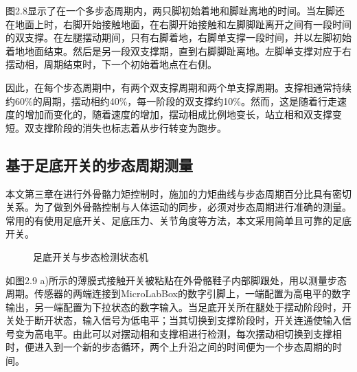 图2.8显示了在一个多步态周期内，两只脚初始着地和脚趾离地的时间。当左脚还在地面上时，右脚开始接触地面，在右脚开始接触和左脚脚趾离开之间有一段时间的双支撑。在左腿摆动期间，只有右脚着地，右脚单支撑一段时间，并以左脚初始着地地面结束。然后是另一段双支撑期，直到右脚脚趾离地。左脚单支撑对应于右摆动相，周期结束时，下一个初始着地点在右侧。

因此，在每个步态周期中，有两个双支撑周期和两个单支撑周期。支撑相通常持续约60\%的周期，摆动相约40\%，每一阶段的双支撑约10\%。然而，这是随着行走速度的增加而变化的，随着速度的增加，摆动相成比例地变长，站立相和双支撑变短。双支撑阶段的消失也标志着从步行转变为跑步。

\subsection{基于足底开关的步态周期测量}

本文第三章在进行外骨骼力矩控制时，施加的力矩曲线与步态周期百分比具有密切关系。为了做到外骨骼控制与人体运动的同步，必须对步态周期进行准确的测量。常用的有使用足底开关、足底压力、关节角度等方法，本文采用简单且可靠的足底开关。

\begin{figure}[htb]
    \quad
    \caption{足底开关与步态检测状态机}
    \label{fig:subfigss}
\end{figure}

如图2.9 a)所示的薄膜式接触开关被粘贴在外骨骼鞋子内部脚跟处，用以测量步态周期。传感器的两端连接到MicroLabBox的数字引脚上，一端配置为高电平的数字输出，另一端配置为下拉状态的数字输入。当足底开关所在腿处于摆动阶段时，开关处于断开状态，输入信号为低电平；当其切换到支撑阶段时，开关连通使输入信号变为高电平。由此可以对摆动相和支撑相进行检测，每次摆动相切换到支撑相时，便进入到一个新的步态循环，两个上升沿之间的时间便为一个步态周期的时间。


